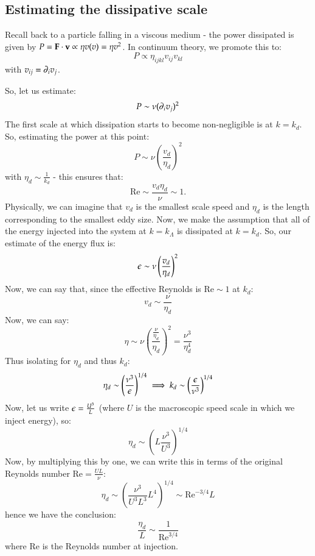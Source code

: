 \subsection{Estimating the dissipative scale}
Recall back to a particle falling in a viscous medium - the power dissipated is given by $P = \mathbf{F} \cdot \mathbf{v} \propto \eta v(v) = \eta v^2$. In continuum theory, we promote this to:
\begin{equation}
    P \propto \eta_{ijkl}v_{ij}v_{kl}
\end{equation}
with $v_{ij} = \partial_i v_j$. 

So, let us estimate:
\begin{equation}
    P \sim \nu(\partial_i v_j)^2
\end{equation}
The first scale at which dissipation starts to become non-negligible is at $k = k_d$. So, estimating the power at this point:
\begin{equation}
    P \sim \nu \left(\frac{v_d}{\eta_d}\right)^2
\end{equation}
with $\eta_d \sim \frac{1}{k_d}$ - this ensures that:
\begin{equation}
    \text{Re} \sim \frac{v_d\eta_d}{\nu} \sim 1.
\end{equation}
Physically, we can imagine that $v_d$ is the smallest scale speed and $\eta_d$ is the length corresponding to the smallest eddy size. Now, we make the assumption that all of the energy injected into the system at $k = k_\Lambda$ is dissipated at $k = k_d$. So, our estimate of the energy flux is:
\begin{equation}
    \epsilon \sim \nu \left(\frac{v_d}{\eta_d}\right)^2
\end{equation}
Now, we can say that, since the effective Reynolds is $\text{Re} \sim 1$ at $k_d$:
\begin{equation}
    v_d \sim \frac{\nu}{\eta_d}
\end{equation}
Now, we can say:
\begin{equation}
    \eta \sim \nu \left(\frac{\frac{\nu}{\eta_d}}{\eta_d}\right)^2 = \frac{\nu^3}{\eta_d^4}
\end{equation}
Thus isolating for $\eta_d$ and thus $k_d$:
\begin{equation}
    \eta_d \sim \left(\frac{\nu^3}{\epsilon}\right)^{1/4} \implies k_d \sim \left(\frac{\epsilon}{\nu^3}\right)^{1/4}
\end{equation}
Now, let us write $\epsilon = \frac{U^3}{L}$ (where $U$ is the macroscopic speed scale in which we inject energy), so:
\begin{equation}
    \eta_d \sim \left(L\frac{\nu^3}{U^3}\right)^{1/4}
\end{equation}
Now, by multiplying this by one, we can write this in terms of the original Reynolds number $\text{Re} = \frac{UL}{\nu}$:
\begin{equation}
    \eta_d \sim \left(\frac{\nu^3}{U^3L^3}L^4\right)^{1/4} \sim \text{Re}^{-3/4}L
\end{equation}
hence we have the conclusion:
\begin{equation}
   \boxed{\frac{\eta_d}{L} \sim \frac{1}{\text{Re}^{3/4}}}
\end{equation}
where $\text{Re}$ is the Reynolds number at injection.

